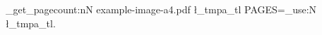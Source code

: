 \documentclass{article}
\begin{document}
\ExplSyntaxOn
\graphics_get_pagecount:nN {example-image-a4.pdf} \l_tmpa_tl
PAGES=\tl_use:N \l_tmpa_tl.
\ExplSyntaxOff
\end{document}
